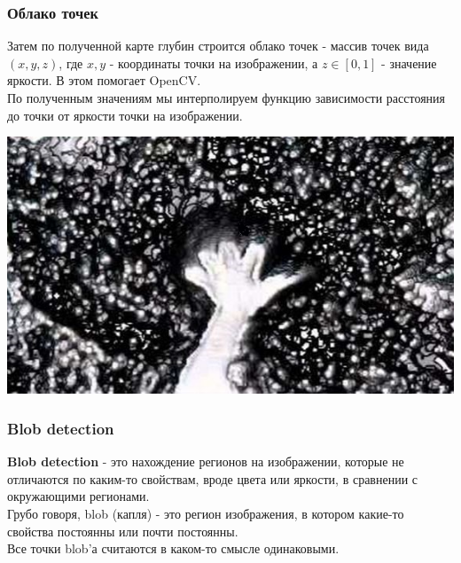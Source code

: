 \documentclass{beamer}
\begin{document}
		\begin{frame}
			\frametitle{Облако точек}
			
			Затем по полученной карте глубин строится облако точек - массив
			точек вида $(x, y, z)$, где $x, y$ - координаты точки на изображении, а
			$z \in [0, 1]$ - значение яркости. В этом помогает OpenCV.\\
			По полученным значениям мы интерполируем функцию зависимости расстояния до     
			точки от яркости точки на изображении.
			
			\begin{center}
				\includegraphics[scale=0.7]{images/leapPointCloud}
			\end{center}
		\end{frame}
		
		\begin{frame}
			\frametitle{Blob detection}
			
			\textbf{Blob detection} - это нахождение регионов на изображении,
			которые не отличаются по каким-то свойствам, вроде цвета
			или яркости, в сравнении с окружающими регионами.\\
			Грубо говоря, blob (капля) - это регион изображения,
			в котором какие-то свойства постоянны или почти
			постоянны.\\
			Все точки blob'а считаются в каком-то смысле
			одинаковыми.\\
		\end{frame}
		
\end{document}
